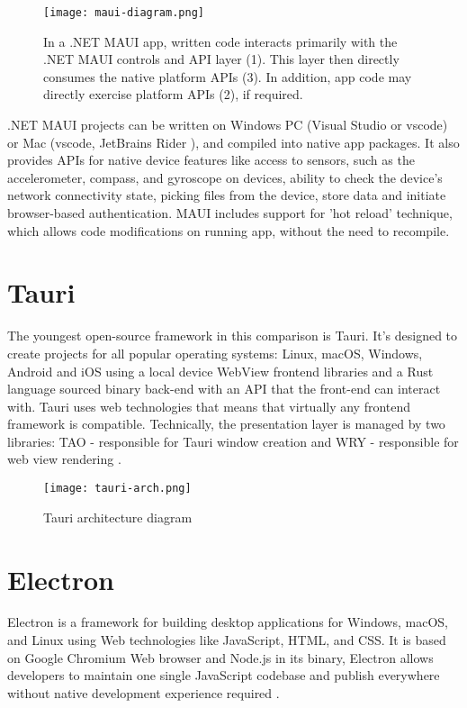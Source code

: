 \begin{figure}[H]
    \centering
    \texttt{[image: maui-diagram.png]}
    \caption[MAUI architecture]{\label{fig:maui} In a .NET MAUI app, written code interacts primarily  with the .NET MAUI controls and API layer (1). This layer then directly consumes the native platform APIs (3). In addition, app code may directly exercise platform APIs (2), if required. \autocite{MAUIDocs}}
\end{figure}

.NET MAUI projects can be written on Windows PC (Visual Studio or vscode) or Mac (vscode, JetBrains Rider \autocite{JBrainsRider}), and compiled into native app packages.
It also  provides APIs for native device features like access to sensors, such as the accelerometer, compass, and gyroscope on devices, ability to check the device's network connectivity state, picking files from the device, store data and initiate browser-based authentication. MAUI includes support for 'hot reload' technique, which allows code modifications on running app, without the need to recompile. 




\section{{Tauri}}%
\label{sec:tauri}

The youngest open-source framework in this comparison is Tauri. It's designed to create projects for all popular operating systems: Linux, macOS, Windows, Android and iOS using a local device WebView \autocite{WebView} frontend libraries and a Rust language \autocite{RustWiki} sourced binary back-end with an API that the front-end can interact with. Tauri uses web technologies that means that virtually any frontend framework is compatible. Technically, the presentation layer is managed by two libraries: TAO - responsible for Tauri window creation and WRY - responsible for web view rendering \autocite{TauriDoc}. 

\begin{figure}[H]
    \centering
    \texttt{[image: tauri-arch.png]}
    \caption[Tauri architecture]{\label{fig:tauri} Tauri architecture diagram }
\end{figure}


\section{{Electron}}%
\label{sec:electron}
Electron is a framework for building desktop applications for Windows, macOS, and Linux using Web technologies like JavaScript, HTML, and CSS. It is based on Google Chromium Web browser and Node.js in its binary, Electron allows developers to maintain one single JavaScript codebase and publish everywhere without native development experience required \autocite{ElectronDoc}.

